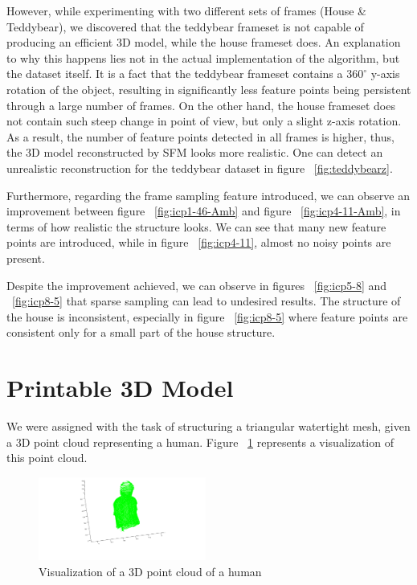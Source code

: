 However, while experimenting with two different sets of frames (House \& Teddybear), we discovered that the teddybear frameset is not capable of producing an efficient 3D model, while the house frameset does. An explanation to why this happens lies not in the actual implementation of the algorithm, but the dataset itself. It is a fact that the teddybear frameset contains a $360^{\circ}$ y-axis rotation of the object, resulting in significantly less feature points being persistent through a large number of frames. 
On the other hand, the house frameset does not contain such steep change in point of view, but only a slight z-axis rotation. As a result, the number of feature points detected in all frames is higher, thus, the 3D model reconstructed by SFM looks more realistic. One can detect an unrealistic reconstruction for the teddybear dataset in figure ~\ref{fig:teddybearz}.



Furthermore, regarding the frame sampling feature introduced, we can observe an improvement between figure ~\ref{fig:icp1-46-Amb} and figure ~\ref{fig:icp4-11-Amb}, in terms of how realistic the structure looks. We can see that many new feature points are introduced, while in figure ~\ref{fig:icp4-11}, almost no noisy points are present.

Despite the improvement achieved, we can observe in figures ~\ref{fig:icp5-8} and ~\ref{fig:icp8-5} that sparse sampling can lead to undesired results. The structure of the house is inconsistent, especially in figure ~\ref{fig:icp8-5} where feature points are consistent only for a small part of the house structure. 

\section{Printable 3D Model}

We were assigned with the task of structuring a triangular watertight mesh, given a 3D point cloud representing a human.
Figure ~\ref{fig:sundin-pointcloud} represents a visualization of this point cloud.
\begin{figure}[ht!]
  \centering
    \includegraphics[width=0.49\textwidth]
    {figures/pointCloud_sundin.png}
    \caption{Visualization of a 3D point cloud of a human}
    \label{fig:sundin-pointcloud}
\end{figure}


